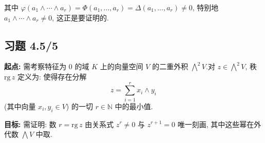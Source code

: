 其中 $\varphi(a_1 \wedge \cdots \wedge a_r) = \Phi(a_1, \ldots, a_r) =
\varDelta(a_1, \ldots, a_r) \neq 0$, 特别地 $a_1 \wedge \cdots \wedge a_r \neq 0$,
这正是要证明的.

\subsection*{习题 4.5/5}

\noindent\textbf{起点:} 需考察特征为 $0$ 的域 $K$ 上的向量空间 $V$ 的二重外积
$\bigwedge^2 V$.对 $z \in \bigwedge^2 V$, 秩 $\mathrm{rg}\, z$ 定义为: 使得存在分解
\[
z = \sum_{i=1}^{r} x_i \wedge y_i
\]
(其中向量 $x_i, y_i \in V$) 的一切 $r \in \mathbb{N}$ 中的最小值.

\noindent\textbf{目标:} 需证明: 数 $r = \mathrm{rg}\, z$ 由关系式 $z^r \neq 0$ 与
$z^{r+1} = 0$ 唯一刻画, 其中这些幂在外代数 $\bigwedge V$ 中取.


